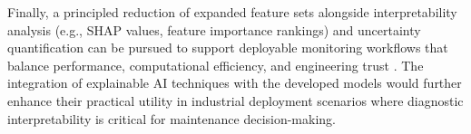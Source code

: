 Finally, a principled reduction of expanded feature sets alongside interpretability analysis (e.g., SHAP values, feature importance rankings) and uncertainty quantification can be pursued to support deployable monitoring workflows that balance performance, computational efficiency, and engineering trust \parencite{Vera_2023_1, Klein_2024_1}. The integration of explainable AI techniques with the developed models would further enhance their practical utility in industrial deployment scenarios where diagnostic interpretability is critical for maintenance decision-making.
